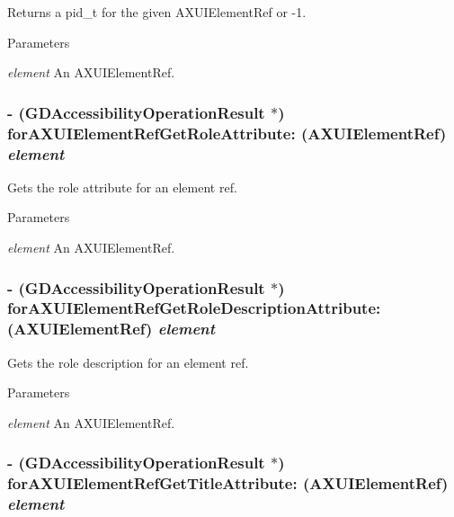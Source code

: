 Returns a pid\_\-t for the given AXUIElementRef or -\/1. 
\begin{DoxyParams}{Parameters}
\item[{\em element}]An AXUIElementRef. \end{DoxyParams}
\hypertarget{interface_g_d_accessibility_manager_ace17f7f1f4ea531e557e95951532c715}{
\subsubsection[{forAXUIElementRefGetRoleAttribute:}]{\setlength{\rightskip}{0pt plus 5cm}-\/ ({\bf GDAccessibilityOperationResult} $\ast$) forAXUIElementRefGetRoleAttribute: (AXUIElementRef) {\em element}}}
\label{interface_g_d_accessibility_manager_ace17f7f1f4ea531e557e95951532c715}


Gets the role attribute for an element ref. 
\begin{DoxyParams}{Parameters}
\item[{\em element}]An AXUIElementRef. \end{DoxyParams}
\hypertarget{interface_g_d_accessibility_manager_a9baf3dca0931b22a95686fe9334bde04}{
\subsubsection[{forAXUIElementRefGetRoleDescriptionAttribute:}]{\setlength{\rightskip}{0pt plus 5cm}-\/ ({\bf GDAccessibilityOperationResult} $\ast$) forAXUIElementRefGetRoleDescriptionAttribute: (AXUIElementRef) {\em element}}}
\label{interface_g_d_accessibility_manager_a9baf3dca0931b22a95686fe9334bde04}


Gets the role description for an element ref. 
\begin{DoxyParams}{Parameters}
\item[{\em element}]An AXUIElementRef. \end{DoxyParams}
\hypertarget{interface_g_d_accessibility_manager_aef0a1b068f6f5a31cf44aaad7bce6654}{
\subsubsection[{forAXUIElementRefGetTitleAttribute:}]{\setlength{\rightskip}{0pt plus 5cm}-\/ ({\bf GDAccessibilityOperationResult} $\ast$) forAXUIElementRefGetTitleAttribute: (AXUIElementRef) {\em element}}}
\label{interface_g_d_accessibility_manager_aef0a1b068f6f5a31cf44aaad7bce6654}


